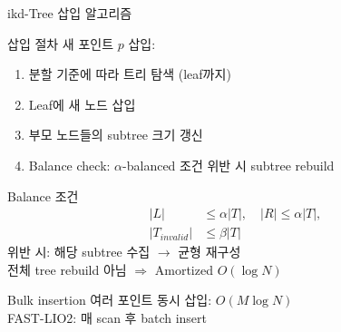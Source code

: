 \begin{frame}{ikd-Tree 삽입 알고리즘}
  \begin{block}{삽입 절차}
    새 포인트 $p$ 삽입:
    \begin{enumerate}
      \item 분할 기준에 따라 트리 탐색 (leaf까지)
      \item Leaf에 새 노드 삽입
      \item 부모 노드들의 subtree 크기 갱신
      \item Balance check: $\alpha$-balanced 조건 위반 시 subtree rebuild
    \end{enumerate}
  \end{block}
  \pause
  \begin{block}{Balance 조건}
    \begin{align*}
      |L| &\leq \alpha|T|, \quad |R| \leq \alpha|T|,\\
      |T_{invalid}| &\leq \beta|T|
    \end{align*}
    위반 시: 해당 subtree 수집 $\to$ 균형 재구성\\
    전체 tree rebuild 아님 $\Rightarrow$ Amortized $O(\log N)$
  \end{block}
  \pause
  \begin{exampleblock}{Bulk insertion}
    여러 포인트 동시 삽입: $O(M\log N)$\\
    FAST-LIO2: 매 scan 후 batch insert
  \end{exampleblock}
\end{frame}


